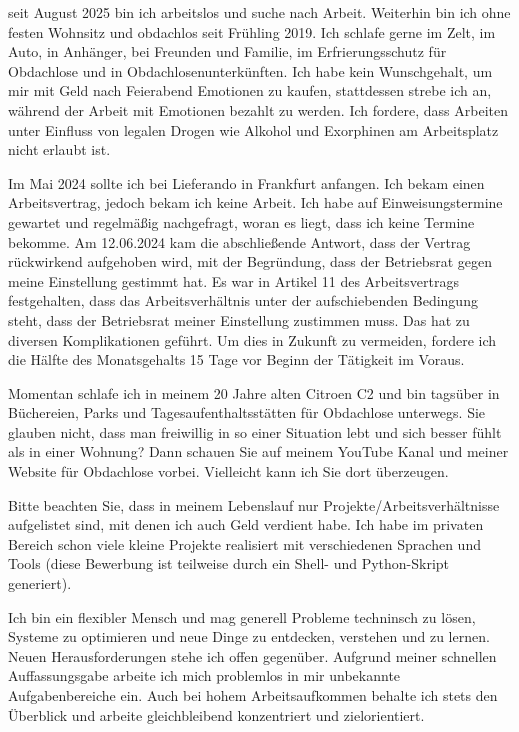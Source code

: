 		seit August 2025 bin ich arbeitslos und suche nach Arbeit.
		Weiterhin bin ich ohne festen Wohnsitz und obdachlos seit Frühling 2019.
		Ich schlafe gerne im Zelt, im Auto, in Anhänger, bei Freunden und Familie, im Erfrierungsschutz für Obdachlose und in Obdachlosenunterkünften.
		Ich habe kein Wunschgehalt, um mir mit Geld nach Feierabend Emotionen zu kaufen, stattdessen strebe ich an, während der Arbeit mit Emotionen bezahlt zu werden.
		Ich fordere, dass Arbeiten unter Einfluss von legalen Drogen wie Alkohol und Exorphinen am Arbeitsplatz nicht erlaubt ist.

		Im Mai 2024 sollte ich bei Lieferando in Frankfurt anfangen.
		Ich bekam einen Arbeitsvertrag, jedoch bekam ich keine Arbeit.
		Ich habe auf Einweisungstermine gewartet und regelmäßig nachgefragt, woran es liegt, dass ich keine Termine bekomme.
		Am 12.06.2024 kam die abschließende Antwort, dass der Vertrag rückwirkend aufgehoben wird, mit der Begründung, dass der Betriebsrat gegen meine Einstellung gestimmt hat.
		Es war in Artikel 11 des Arbeitsvertrags festgehalten, dass das Arbeitsverhältnis unter der aufschiebenden Bedingung steht, dass der Betriebsrat meiner Einstellung zustimmen muss.
		Das hat zu diversen Komplikationen geführt.
		Um dies in Zukunft zu vermeiden, fordere ich die Hälfte des Monatsgehalts 15 Tage vor Beginn der Tätigkeit im Voraus.

		Momentan schlafe ich in meinem 20 Jahre alten Citroen C2 und bin tagsüber in Büchereien, Parks und Tagesaufenthaltsstätten für Obdachlose unterwegs.
		Sie glauben nicht, dass man freiwillig in so einer Situation lebt und sich besser fühlt als in einer Wohnung?
		Dann schauen Sie auf meinem YouTube Kanal  und meiner Website für Obdachlose  vorbei.
		Vielleicht kann ich Sie dort überzeugen.

		Bitte beachten Sie, dass in meinem Lebenslauf nur Projekte/Arbeitsverhältnisse aufgelistet sind, mit denen ich auch Geld verdient habe.
		Ich habe im privaten Bereich schon viele kleine Projekte realisiert mit verschiedenen Sprachen und Tools (diese Bewerbung ist teilweise durch ein Shell- und Python-Skript generiert).

		Ich bin ein flexibler Mensch und mag generell Probleme techninsch zu lösen, Systeme zu optimieren und neue Dinge zu entdecken, verstehen und zu lernen.
		Neuen Herausforderungen stehe ich offen gegenüber.
		Aufgrund meiner schnellen Auffassungsgabe arbeite ich mich problemlos in mir unbekannte Aufgabenbereiche ein.
		Auch bei hohem Arbeitsaufkommen behalte ich stets den Überblick und arbeite gleichbleibend konzentriert und zielorientiert.


